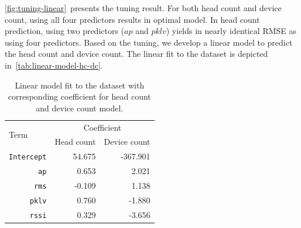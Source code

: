 	\autoref{fig:tuning-linear}~presents the tuning result. For both head count and device count, using all four predictors results in optimal model. In head count prediction, using two predictors ($ap$ and $pklv$) yields in nearly identical \ac{RMSE} as using four predictors. Based on the tuning, we develop a linear model to predict the head count and device count. The linear fit to the dataset is depicted in~\autoref{tab:linear-model-hc-dc}.

	
		\begin{table}[h]
		\centering
		\caption{Linear model fit to the dataset with corresponding coefficient for head count and device count model.}
		\label{tab:linear-model-hc-dc}
		\begin{tabular}{rrr}
		\toprule
		\multicolumn{1}{l}{\multirow{2}{*}{Term}} & \multicolumn{2}{c}{Coefficient}                                   \\
		\multicolumn{1}{l}{}                      & \multicolumn{1}{c}{Head count} & \multicolumn{1}{c}{Device count} \\ \midrule
		\verb|Intercept|                          & 54.675 & -367.901 \\
		\verb|ap|                                 & 0.653  & 2.021 \\
		\verb|rms|                                & -0.109 & 1.138 \\
		\verb|pklv|                               & 0.760  & -1.880 \\
		\verb|rssi|                               & 0.329  & -3.656 \\ \bottomrule
		\end{tabular}
		\end{table}
	


	



